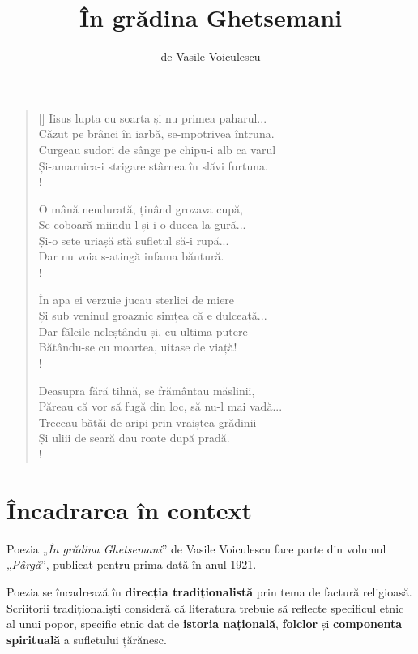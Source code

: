 \documentclass{article}
\title{În grădina Ghetsemani}
\author{de Vasile Voiculescu}
\date{}
\newcommand{\qu}[1]{„\emph{#1}”}
\begin{document}
\maketitle

\settowidth{\versewidth}{Păreau că vor să fugă din loc, să nu-l mai vadă...}
\begin{verse}[\versewidth]
Iisus lupta cu soarta și nu primea paharul... \\
Căzut pe brânci în iarbă, se-mpotrivea întruna. \\
Curgeau sudori de sânge pe chipu-i alb ca varul \\
Și-amarnica-i strigare stârnea în slăvi furtuna. \\!

O mână nendurată, ținând grozava cupă, \\
Se coboară-miindu-l și i-o ducea la gură... \\
Și-o sete uriașă stă sufletul să-i rupă... \\
Dar nu voia s-atingă infama băutură. \\!

În apa ei verzuie jucau sterlici de miere \\
Și sub veninul groaznic simțea că e dulceață... \\
Dar fălcile-ncleștându-și, cu ultima putere \\
Bătându-se cu moartea, uitase de viață! \\!

Deasupra fără tihnă, se frământau măslinii, \\
Păreau că vor să fugă din loc, să nu-l mai vadă... \\
Treceau bătăi de aripi prin vraiștea grădinii \\
Și uliii de seară dau roate după pradă. \\!
\end{verse}

\section{Încadrarea în context}
Poezia \qu{În grădina Ghetsemani} de Vasile Voiculescu face parte din volumul \qu{Pârgă}, publicat pentru prima dată în anul 1921.

Poezia se încadrează în \textbf{direcția tradiționalistă} prin tema de factură religioasă. Scriitorii tradiționa\-liști consideră că literatura trebuie să reflecte specificul etnic al unui popor, specific etnic dat de \textbf{istoria națională}, \textbf{folclor} și \textbf{componenta spirituală} a sufletului țărănesc. 
\end{document}
